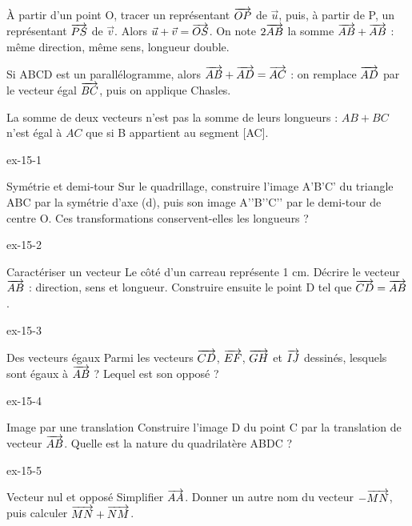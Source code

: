 \begin{savoirfaire}À partir d’un point O, tracer un représentant $\overrightarrow{OP}$ de $\vec u$, puis, à partir de P, un représentant $\overrightarrow{PS}$ de $\vec v$. Alors $\vec u+\vec v=\overrightarrow{OS}$. On note $2\overrightarrow{AB}$ la somme $\overrightarrow{AB}+\overrightarrow{AB}$ : même direction, même sens, longueur double.\end{savoirfaire}
\begin{propriete}Si ABCD est un parallélogramme, alors $\overrightarrow{AB}+\overrightarrow{AD}=\overrightarrow{AC}$ : on remplace $\overrightarrow{AD}$ par le vecteur égal $\overrightarrow{BC}$, puis on applique Chasles.\end{propriete}
\begin{attention}La somme de deux vecteurs n’est pas la somme de leurs longueurs : $AB+BC$ n’est égal à $AC$ que si B appartient au segment [AC].\end{attention}
\clearpage{}
\begin{blocLivre}{ex-15-1}\begin{exercice}[1]{Symétrie et demi-tour}
Sur le quadrillage, construire l’image A’B’C’ du triangle ABC par la symétrie d’axe (d), puis son image A’’B’’C’’ par le demi-tour de centre O. Ces transformations conservent-elles les longueurs ?
\label{fig-ex-15-1}
\end{exercice}\end{blocLivre}
\begin{blocLivre}{ex-15-2}\begin{exercice}[1]{Caractériser un vecteur}
Le côté d’un carreau représente 1 cm. Décrire le vecteur $\overrightarrow{AB}$ : direction, sens et longueur. Construire ensuite le point D tel que $\overrightarrow{CD}=\overrightarrow{AB}$.
\label{fig-ex-15-2}
\end{exercice}\end{blocLivre}
\begin{blocLivre}{ex-15-3}\begin{exercice}[1]{Des vecteurs égaux}
Parmi les vecteurs $\overrightarrow{CD}$, $\overrightarrow{EF}$, $\overrightarrow{GH}$ et $\overrightarrow{IJ}$ dessinés, lesquels sont égaux à $\overrightarrow{AB}$ ? Lequel est son opposé ?
\label{fig-ex-15-3}
\end{exercice}\end{blocLivre}
\begin{blocLivre}{ex-15-4}\begin{exercice}[1]{Image par une translation}
Construire l’image D du point C par la translation de vecteur $\overrightarrow{AB}$. Quelle est la nature du quadrilatère ABDC ?
\label{fig-ex-15-4}
\end{exercice}\end{blocLivre}
\begin{blocLivre}{ex-15-5}\begin{exercice}[1]{Vecteur nul et opposé}
Simplifier $\overrightarrow{AA}$. Donner un autre nom du vecteur $-\overrightarrow{MN}$, puis calculer $\overrightarrow{MN}+\overrightarrow{NM}$.
\label{fig-ex-15-5}
\end{exercice}\end{blocLivre}

